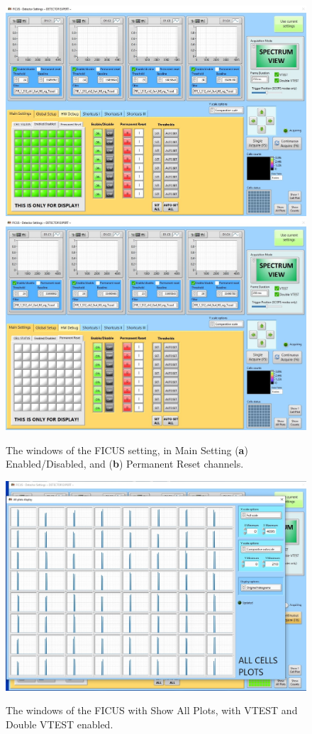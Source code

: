 \documentclass[a4paper,12pt,oneside,pdflatex,italian,final,twocolumn]{article}
\begin{document}
\begin{figure}[h]
\centering
\subfloat
{\includegraphics[width=.48\textwidth]{Capture60.jpg}} \quad
\subfloat
{\includegraphics[width=.48\textwidth]{Capture61.jpg}} \\
\caption{The windows of the FICUS setting, in Main Setting (\textbf{a}) Enabled/Disabled, and (\textbf{b}) Permanent Reset channels.}\label{fig:fig7bis}
\end{figure}

\begin{figure}[h]
\centering
{\includegraphics[width=.80\textwidth]{Capture21.jpg}} \quad
\caption{The windows of the FICUS with Show All Plots, with VTEST and Double VTEST enabled.}\label{fig:fig8}
\end{figure}
\end{document}
